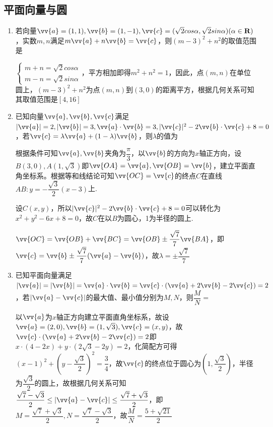 \subsection*{平面向量与圆}
\begin{enumerate}
    \item 若向量$\vv{a} = (1, 1), \vv{b} = (1, -1), \vv{c} = (\sqrt{2} cos\alpha, \sqrt{2}sin\alpha) (\alpha \in \mathbf{R})$，实数$m, n$满足$m \vv{a} + n \vv{b} = \vv{c}$，则$(m-3)^2+n^2$的取值范围是\blkda{$[4, 16]$}
    \begin{jieda}
        $\left \{ \begin{array}{l}
                m+n = \sqrt{2}cos\alpha  \\
                m-n = \sqrt{2}sin\alpha
        \end{array} \right.$，平方相加即得$m^2+n^2 = 1$，因此，点$(m,n)$在单位圆上，$(m-3)^2+n^2$为点$(m,n)$到$(3,0)$的距离平方，根据几何关系可知其取值范围是$[4, 16]$
    \end{jieda}
    
    \item 已知向量$\vv{a}, \vv{b}, \vv{c}$满足$|\vv{a}| = 2, |\vv{b}| = 3, \vv{a} \cdot \vv{b} = 3, |\vv{c}|^2 - 2\vv{b} \cdot \vv{c} + 8 = 0$，若$\vv{c} = \lambda \vv{a} + (1-\lambda) \vv{b}$，则$\lambda$的值为
    \begin{jieda}
        根据条件可知$\vv{a}, \vv{b}$夹角为$\dfrac{\pi}{3}$，以$\vv{b}$的方向为$x$轴正方向，设$B(3, 0), A(1, \sqrt{3})$即$\vv{OA} = \vv{a}, \vv{OB} = \vv{b}$，建立平面直角坐标系。根据等和线结论可知$\vv{OC} = \vv{c}$的终点$C$在直线$AB: y = -\dfrac{\sqrt{3}}{2}(x-3)$上.
        
        设$C(x, y)$，所以$|\vv{c}|^2 - 2\vv{b} \cdot \vv{c} + 8 = 0$可以转化为$x^2+y^2 - 6x + 8 = 0$，故$C$在以$B$为圆心，1为半径的圆上.
        
        $\vv{OC} = \vv{OB} + \vv{BC} = \vv{OB} \pm \dfrac{\sqrt{7}}{7}\vv{BA}$，即$\vv{c} = \vv{b} \pm \dfrac{\sqrt{7}}{7}(\vv{a} - \vv{b})$，故$\lambda = \pm \dfrac{\sqrt{7}}{7}$
    \end{jieda}

    \item 已知平面向量满足$|\vv{a}| = |\vv{b}| = \vv{a} \cdot \vv{b} = \vv{c} \cdot (\vv{a} + 2\vv{b}-2\vv{c}) = 2$，若$|\vv{a} - \vv{c}|$的最大值、最小值分别为$M, N$，则$\dfrac{M}{N} = $
    \begin{jieda}
        以$\vv{a}$为$x$轴正方向建立平面直角坐标系，故设$\vv{a} = (2, 0), \vv{b} = (1, \sqrt{3}), \vv{c} = (x, y)$，故$\vv{c} \cdot (\vv{a} + 2\vv{b}-2\vv{c}) = 2$即$x \cdot (4-2x) + y \cdot (2\sqrt{3} - 2y) = 2$，化简配方可得$(x-1)^2 + (y - \dfrac{\sqrt{3}}{2})^2 = \dfrac{3}{4}$，故$\vv{c}$的终点位于圆心为$(1, \dfrac{\sqrt{3}}{2})$，半径为$\dfrac{\sqrt{3}}{2}$的圆上，故根据几何关系可知$\dfrac{\sqrt{7} - \sqrt{3}}{2} \leq |\vv{a} - \vv{c}| \leq \dfrac{\sqrt{7} + \sqrt{3}}{2}$，即$M = \dfrac{\sqrt{7}+\sqrt{3}}{2}, N = \dfrac{\sqrt{7} - \sqrt{3}}{2}$，故$\dfrac{M}{N} = \dfrac{5+\sqrt{21}}{2}$
    \end{jieda}
    

\end{enumerate}
